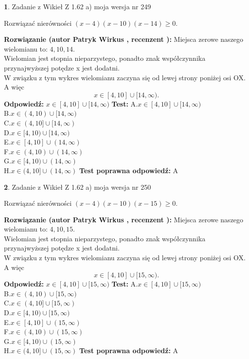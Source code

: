 \documentclass[12pt, a4paper]{article}
\theoremstyle{definition} %
\newtheorem{zad}{}
\newcommand{\zadStart}[1]{\begin{zad}#1\newline}
\newcommand{\zadStop}{\end{zad}}
\newcommand{\rozwStart}[2]{\noindent \textbf{Rozwiązanie (autor #1 , recenzent #2): }\newline}
\newcommand{\rozwStop}{\newline}
\newcommand{\odpStart}{\noindent \textbf{Odpowiedź:}\newline}
\newcommand{\odpStop}{\newline}
\newcommand{\testStart}{\noindent \textbf{Test:}\newline}
\newcommand{\testStop}{\newline}
\newcommand{\kluczStart}{\noindent \textbf{Test poprawna odpowiedź:}\newline}
\newcommand{\kluczStop}{\newline}
\begin{document}
\zadStart{Zadanie z Wikieł Z 1.62 a) moja wersja nr 249}

Rozwiązać nierówności $(x-4)(x-10)(x-14)\ge0$.
\zadStop
\rozwStart{Patryk Wirkus}{}
Miejsca zerowe naszego wielomianu to: $4, 10, 14$.\\
Wielomian jest stopnia nieparzystego, ponadto znak współczynnika przy\linebreak najwyższej potędze x jest dodatni.\\ W związku z tym wykres wielomianu zaczyna się od lewej strony poniżej osi OX. A więc $$x \in [4,10] \cup [14,\infty).$$
\rozwStop
\odpStart
$x \in [4,10] \cup [14,\infty)$
\odpStop
\testStart
A.$x \in [4,10] \cup [14,\infty)$\\
B.$x \in (4,10) \cup [14,\infty)$\\
C.$x \in (4,10] \cup [14,\infty)$\\
D.$x \in [4,10) \cup [14,\infty)$\\
E.$x \in [4,10] \cup (14,\infty)$\\
F.$x \in (4,10) \cup (14,\infty)$\\
G.$x \in [4,10) \cup (14,\infty)$\\
H.$x \in (4,10] \cup (14,\infty)$
\testStop
\kluczStart
A
\kluczStop



\zadStart{Zadanie z Wikieł Z 1.62 a) moja wersja nr 250}

Rozwiązać nierówności $(x-4)(x-10)(x-15)\ge0$.
\zadStop
\rozwStart{Patryk Wirkus}{}
Miejsca zerowe naszego wielomianu to: $4, 10, 15$.\\
Wielomian jest stopnia nieparzystego, ponadto znak współczynnika przy\linebreak najwyższej potędze x jest dodatni.\\ W związku z tym wykres wielomianu zaczyna się od lewej strony poniżej osi OX. A więc $$x \in [4,10] \cup [15,\infty).$$
\rozwStop
\odpStart
$x \in [4,10] \cup [15,\infty)$
\odpStop
\testStart
A.$x \in [4,10] \cup [15,\infty)$\\
B.$x \in (4,10) \cup [15,\infty)$\\
C.$x \in (4,10] \cup [15,\infty)$\\
D.$x \in [4,10) \cup [15,\infty)$\\
E.$x \in [4,10] \cup (15,\infty)$\\
F.$x \in (4,10) \cup (15,\infty)$\\
G.$x \in [4,10) \cup (15,\infty)$\\
H.$x \in (4,10] \cup (15,\infty)$
\testStop
\kluczStart
A
\kluczStop
\end{document}
